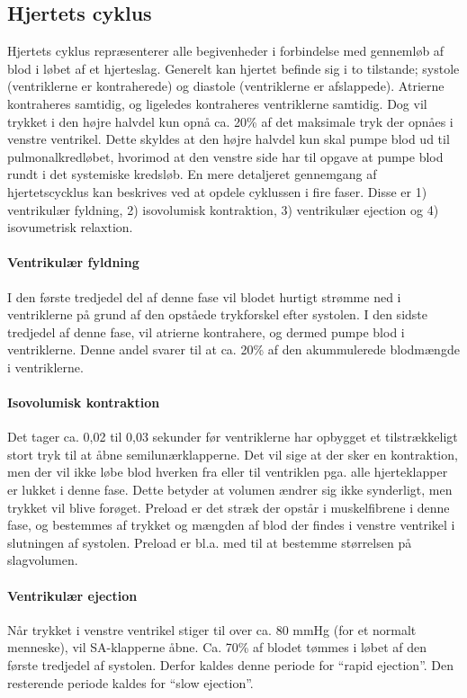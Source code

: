 \subsection{Hjertets cyklus}
Hjertets cyklus repræsenterer alle begivenheder i forbindelse med gennemløb af blod i løbet af et hjerteslag. Generelt kan hjertet befinde sig i to tilstande; systole (ventriklerne er kontraherede) og diastole (ventriklerne er afslappede). Atrierne kontraheres samtidig, og ligeledes kontraheres ventriklerne samtidig. Dog vil trykket i den højre halvdel kun opnå ca. 20\% af det maksimale tryk der opnåes i venstre ventrikel. Dette skyldes at den højre halvdel kun skal pumpe blod ud til pulmonalkredløbet, hvorimod at den venstre side har til opgave at pumpe blod rundt i det systemiske kredsløb. En mere detaljeret gennemgang af hjertetscycklus kan beskrives ved at opdele cyklussen i fire faser. Disse er 1) ventrikulær fyldning, 2) isovolumisk kontraktion, 3) ventrikulær ejection og 4) isovumetrisk relaxtion.

\paragraph*{Ventrikulær fyldning}
I den første tredjedel del af denne fase vil blodet hurtigt strømme ned i ventriklerne på grund af den opståede trykforskel efter systolen. I den sidste tredjedel af denne fase, vil atrierne kontrahere, og dermed pumpe blod i ventriklerne. Denne andel svarer til at ca. 20\% af den akummulerede blodmængde i ventriklerne. 

\paragraph*{Isovolumisk kontraktion}
Det tager ca. 0,02 til 0,03 sekunder før ventriklerne har opbygget et tilstrækkeligt stort tryk til at åbne semilunærklapperne. Det vil sige at der sker en kontraktion, men der vil ikke løbe blod hverken fra eller til ventriklen pga. alle hjerteklapper er lukket i denne fase. Dette betyder at volumen ændrer sig ikke synderligt, men trykket vil blive forøget. Preload er det stræk der opstår i muskelfibrene i denne fase, og bestemmes af trykket og mængden af blod der findes i venstre ventrikel i slutningen af systolen. Preload er bl.a. med til at bestemme størrelsen på slagvolumen.

\paragraph*{Ventrikulær ejection}
Når trykket i venstre ventrikel stiger til over ca. 80 mmHg (for et normalt menneske), vil SA-klapperne åbne. Ca. 70\% af blodet tømmes i løbet af den første tredjedel af systolen. Derfor kaldes denne periode for “rapid ejection”. Den resterende periode kaldes for “slow ejection”.

